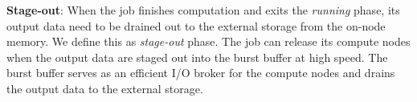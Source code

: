 \textbf{Stage-out}: When the job finishes computation and
         exits the \textit{running} phase, its output data need to be drained out
         to the external storage from the on-node memory. We define this as \textit{stage-out} phase.
         The job can release its compute nodes when the output data are staged out
         into the burst buffer at high speed. The burst buffer serves as an efficient
         I/O broker for the compute nodes and drains the output data to the external storage.





